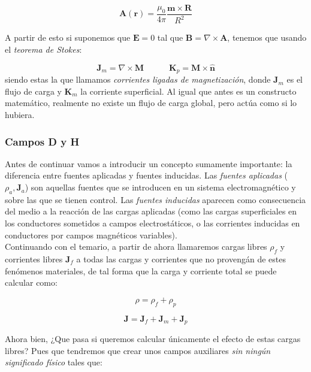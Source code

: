 \documentclass[12pt,a4paper]{article}
\newcommand{\tquad}{\quad \quad \quad}
\newcommand{\rota}{\nabla \times}
\newcommand{\Bn}{\mathbf{B}}
\newcommand{\En}{\mathbf{E}}
\newcommand{\Jn}{\mathbf{J}}
\newcommand{\Kn}{\mathbf{K}}
\newcommand{\rn}{\mathbf{r}}
\newcommand{\An}{\mathbf{A}}
\newcommand{\mn}{\mathbf{m}}
\newcommand{\Mn}{\mathbf{M}}
\newcommand{\Rn}{\mathbf{R}}
\newcommand{\hnn}{\hat{\mathbf{n}}}
\numberwithin{equation}{section}
\numberwithin{figure}{section}
\begin{document}
\begin{equation}
\An (\rn) = \dfrac{\mu_0}{4 \pi} \dfrac{\mn \times \Rn}{R^2}
\end{equation}

A partir de esto si suponemos que $\En=0$ tal que $\Bn = \rota \An$, tenemos que usando el \textit{teorema de Stokes}:

\begin{equation}
\Jn_m = \rota \Mn \tquad \Kn_p = \Mn \times \hnn
\end{equation}
siendo estas la que llamamos \textit{corrientes ligadas de magnetización}, donde $\Jn_m$ es el flujo de carga y $\Kn_m$ la corriente superficial. Al igual que antes es un constructo matemático, realmente no existe un flujo de carga global, pero actúa como si lo hubiera. 

\subsubsection{Campos D y H}

Antes de continuar vamos a introducir un concepto sumamente importante: la diferencia entre fuentes aplicadas y fuentes inducidas. Las \textit{fuentes aplicadas} ($\rho_a,\Jn_a$) son aquellas fuentes que se introducen en un sistema electromagnético y sobre las que se tienen control. Las \textit{fuentes inducidas} aparecen como consecuencia del medio a la  reacción de las cargas aplicadas (como las cargas superficiales en los conductores sometidos a campos electrostáticos, o las corrientes inducidas en conductores por campos magnéticos variables). \\

Continuando con el temario, a partir de ahora llamaremos cargas libres $\rho_f$ y corrientes libres $\Jn_f$ a todas las cargas y corrientes que no provengán de estes fenómenos materiales, de tal forma que la carga y corriente total se puede calcular como:

\begin{equation}
\rho = \rho_f + \rho_p
\end{equation}

\begin{equation}
\Jn = \Jn_f + \Jn_m + \Jn_p
\end{equation}

Ahora bien, ¿Que pasa si queremos calcular únicamente el efecto de estas cargas libres? Pues que tendremos que crear unos campos auxiliares \textit{sin ningún significado físico} tales que:
\end{document}
